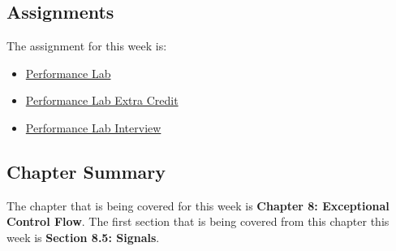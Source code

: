 \subsection{Assignments}

The assignment for this week is:

\begin{itemize}
    \item \href{https://github.com/QuantumCompiler/CU/tree/main/CSPB%202400%20-%20Computer%20Systems/Assignments/Assignment%204%20-%20Performance%20Lab}{Performance Lab}
    \item \href{https://github.com/QuantumCompiler/CU/tree/main/CSPB%202400%20-%20Computer%20Systems/Assignments/Assignment%204%20-%20Performance%20Lab}{Performance Lab Extra Credit}
    \item \href{https://github.com/QuantumCompiler/CU/tree/main/CSPB%202400%20-%20Computer%20Systems/Assignments/Assignment%204%20-%20Performance%20Lab}{Performance Lab Interview}
\end{itemize}

\newpage

\subsection{Chapter Summary}

The chapter that is being covered for this week is \textbf{Chapter 8: Exceptional Control Flow}. The first section that is being covered from this chapter this week is \textbf{Section 8.5: Signals}.

